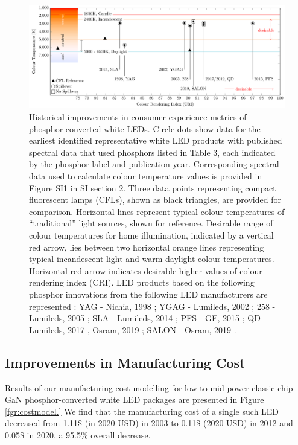 \documentclass[twoside,twocolumn,9pt]{article}
\begin{document}
\begin{figure}[h!]
 \centering
 \includegraphics[width=\textwidth]{2_SSL_EES/article/figures/breakthroughs_consumer-experience.pdf}
 \caption{Historical improvements in consumer experience metrics of phosphor-converted white LEDs. Circle dots show data for the earliest identified representative white LED products with published spectral data that used phosphors listed in Table 3, each indicated by the phosphor label and publication year. Corresponding spectral data used to calculate colour temperature values is provided in Figure SI1 in SI section 2. Three data points representing compact fluorescent lamps (CFLs)\cite{cie_reference}, shown as black triangles, are provided for comparison. Horizontal lines represent typical colour temperatures of “traditional” light sources, shown for reference. Desirable range of colour temperatures for home illumination, indicated by a vertical red arrow, lies between two horizontal orange lines representing typical incandescent light and warm daylight colour temperatures. Horizontal red arrow indicates desirable higher values of colour rendering index (CRI). LED products based on the following phosphor innovations from the following LED manufacturers are represented : YAG - Nichia, 1998 \cite{bando1998development}; YGAG - Lumileds, 2002 \cite{Mueller2002}; 258 - Lumileds, 2005 \cite{MuellerMach2005}; SLA - Lumileds, 2014 \cite{Pust2014}; PFS - GE, 2015 \cite{Murphy2015}; QD - Lumileds, 2017 \cite{lumileds2016qd}, Osram, 2019 \cite{osram2019qd}; SALON - Osram, 2019 \cite{Hoerder2019}.}
 \label{fgr:consumer_experience}
\end{figure}

\subsection{Improvements in Manufacturing Cost}

Results of our manufacturing cost modelling for low-to-mid-power classic chip GaN phosphor-converted white LED packages are presented in Figure \ref{fgr:costmodel.} We find that the manufacturing cost of a single such LED decreased from 1.11\$ (in 2020 USD) in 2003 to 0.11\$ (2020 USD) in 2012 and 0.05\$ in 2020, a 95.5\% overall decrease.
\end{document}
